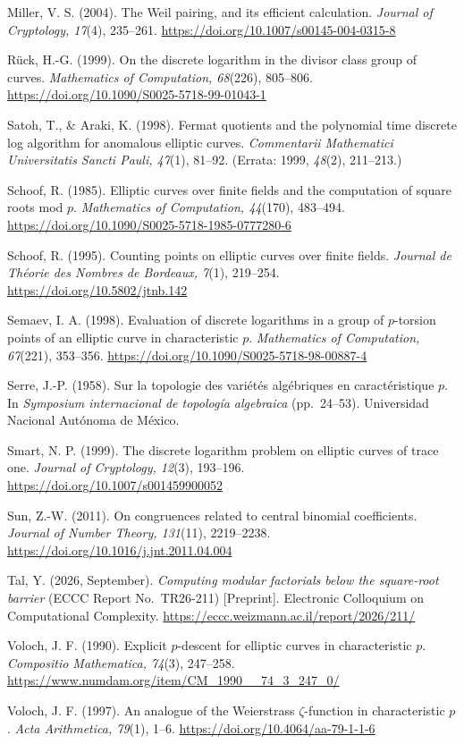\documentclass[11pt,a4paper]{article}
\numberwithin{equation}{section}
\theoremstyle{plain}
\theoremstyle{definition}
\begin{document}
Miller, V. S. (2004). The Weil pairing, and its efficient calculation. \emph{Journal of Cryptology, 17}(4), 235--261. \url{https://doi.org/10.1007/s00145-004-0315-8}

R\"uck, H.-G. (1999). On the discrete logarithm in the divisor class group of curves. \emph{Mathematics of Computation, 68}(226), 805--806. \url{https://doi.org/10.1090/S0025-5718-99-01043-1}

Satoh, T., \& Araki, K. (1998). Fermat quotients and the polynomial time discrete log algorithm for anomalous elliptic curves. \emph{Commentarii Mathematici Universitatis Sancti Pauli, 47}(1), 81--92. (Errata: 1999, \emph{48}(2), 211--213.)

Schoof, R. (1985). Elliptic curves over finite fields and the computation of square roots mod $p$. \emph{Mathematics of Computation, 44}(170), 483--494. \url{https://doi.org/10.1090/S0025-5718-1985-0777280-6}

Schoof, R. (1995). Counting points on elliptic curves over finite fields. \emph{Journal de Th\'eorie des Nombres de Bordeaux, 7}(1), 219--254. \url{https://doi.org/10.5802/jtnb.142}

Semaev, I. A. (1998). Evaluation of discrete logarithms in a group of $p$-torsion points of an elliptic curve in characteristic $p$. \emph{Mathematics of Computation, 67}(221), 353--356. \url{https://doi.org/10.1090/S0025-5718-98-00887-4}

Serre, J.-P. (1958). Sur la topologie des vari\'et\'es alg\'ebriques en caract\'eristique $p$. In \emph{Symposium internacional de topolog\'ia algebraica} (pp.~24--53). Universidad Nacional Aut\'onoma de M\'exico.

Smart, N. P. (1999). The discrete logarithm problem on elliptic curves of trace one. \emph{Journal of Cryptology, 12}(3), 193--196. \url{https://doi.org/10.1007/s001459900052}

Sun, Z.-W. (2011). On congruences related to central binomial coefficients. \emph{Journal of Number Theory, 131}(11), 2219--2238. \url{https://doi.org/10.1016/j.jnt.2011.04.004}

Tal, Y. (2026, September). \emph{Computing modular factorials below the square-root barrier} (ECCC Report No.~TR26-211) [Preprint]. Electronic Colloquium on Computational Complexity. \url{https://eccc.weizmann.ac.il/report/2026/211/}

Voloch, J. F. (1990). Explicit $p$-descent for elliptic curves in characteristic $p$. \emph{Compositio Mathematica, 74}(3), 247--258. \url{https://www.numdam.org/item/CM_1990__74_3_247_0/}

Voloch, J. F. (1997). An analogue of the Weierstrass $\zeta$-function in characteristic $p$. \emph{Acta Arithmetica, 79}(1), 1--6. \url{https://doi.org/10.4064/aa-79-1-1-6}

\endgroup
\end{document}
